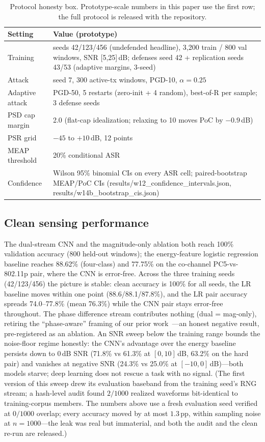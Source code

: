 \documentclass[review]{elsarticle}
\begin{document}
\begin{table}[h]
\centering
\caption{Protocol honesty box. Prototype-scale numbers in this paper use the
first row; the full protocol is released with the repository.}
\label{tab:protocol}
\small
\begin{tabular}{ll}
\toprule
Setting & Value (prototype) \\
\midrule
Training & seeds 42/123/456 (undefended headline), 3{,}200 train / 800 val windows, SNR [5,25]\,dB; defenses seed 42 + replication seeds 43/53 (adaptive margins, 3-seed) \\
Attack & seed 7, 300 active-tx windows, PGD-10, $\alpha=0.25$ \\
Adaptive attack & PGD-50, 5 restarts (zero-init + 4 random), best-of-R per sample; 3 defense seeds \\
PSD cap margin & 2.0 (flat-cap idealization; relaxing to 10 moves PoC by $-0.9$\,dB) \\
PSR grid & $-45$ to $+10$\,dB, 12 points \\
MEAP threshold & 20\% conditional ASR \\
Confidence & Wilson 95\% binomial CIs on every ASR cell; paired-bootstrap MEAP/PoC CIs (results/w12\_confidence\_intervals.json, results/w14b\_bootstrap\_cis.json) \\
\bottomrule
\end{tabular}
\end{table}

\subsection{Clean sensing performance}
\label{sec:clean}

The dual-stream CNN and the magnitude-only ablation both reach 100\%
validation accuracy (800 held-out windows); the energy-feature logistic
regression baseline reaches 88.62\% (four-class) and 77.75\% on the
co-channel PC5-vs-802.11p pair, where the CNN is error-free. Across the
three training seeds (42/123/456) the picture is stable: clean accuracy is
100\% for all seeds, the LR baseline moves within one point
(88.6/88.1/87.8\%), and the LR pair accuracy spreads 74.0--77.8\%
(mean 76.3\%) while the CNN pair stays error-free throughout. The phase
difference stream contributes nothing (dual = mag-only), retiring the
``phase-aware'' framing of our prior work~\cite{vats2026legacy}---an honest
negative result, pre-registered as an ablation. An SNR sweep below the training
range bounds the noise-floor regime honestly: the CNN's advantage over the
energy baseline persists down to 0\,dB SNR (71.8\% vs 61.3\% at
$[0,10]$\,dB, 63.2\% on the hard pair) and vanishes at negative SNR
(24.3\% vs 25.0\% at $[-10,0]$\,dB)---both models starve; deep learning
does not rescue a task with no signal. (The first version of this sweep
drew its evaluation baseband from the training seed's RNG stream; a
hash-level audit found $2/1000$ realized waveforms bit-identical to
training-corpus members. The numbers above use a fresh evaluation seed
verified at $0/1000$ overlap; every accuracy moved by at most
$1.3$\,pp, within sampling noise at $n{=}1000$---the leak was real but
immaterial, and both the audit and the clean re-run are released.)
\end{document}
